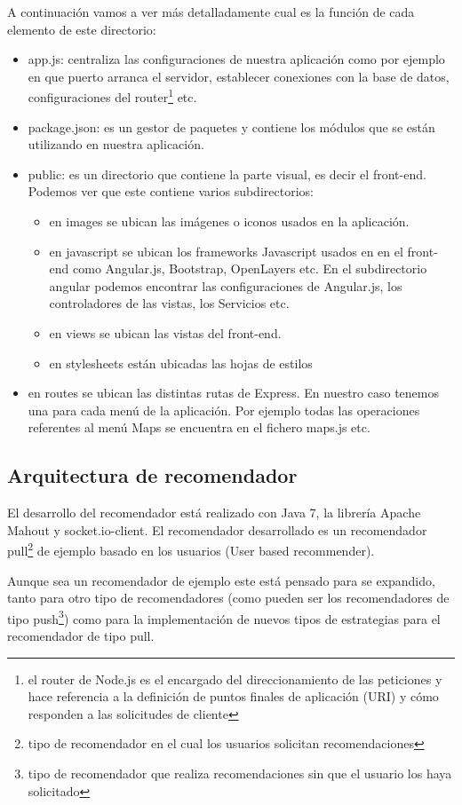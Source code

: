 A continuación vamos a ver más detalladamente cual es la función de cada elemento de este directorio:
\begin{itemize}
	\item app.js: centraliza las configuraciones de nuestra aplicación como por ejemplo en que puerto arranca el servidor, establecer conexiones con la base de datos, configuraciones del router\footnote{el router de Node.js es el encargado del direccionamiento de las peticiones y hace referencia a la definición de puntos finales de aplicación (URI) y cómo responden a las solicitudes de cliente} etc.
	\item package.json: es un gestor de paquetes y contiene los módulos que se están utilizando en nuestra aplicación.
	\item public: es un directorio que contiene la parte visual, es decir el front-end. Podemos ver que este contiene varios subdirectorios:
	\begin{itemize}
	\item en images se ubican las imágenes o iconos usados en la aplicación.
	\item en javascript se ubican los frameworks Javascript usados en en el front-end como Angular.js, Bootstrap, OpenLayers etc. En el subdirectorio angular podemos encontrar las configuraciones de Angular.js, los controladores de las vistas, los Servicios etc.
	\item en views se ubican las vistas del front-end.
	\item en stylesheets están ubicadas las hojas de estilos
	\end{itemize}
	\item en routes se ubican las distintas rutas de Express. En nuestro caso tenemos una para cada menú de la aplicación. Por ejemplo todas las operaciones referentes al menú Maps se encuentra en el fichero maps.js etc.
\end{itemize}

\subsection{Arquitectura de recomendador}


El desarrollo del recomendador está realizado con Java 7, la librería Apache Mahout y socket.io-client. El recomendador desarrollado es un recomendador pull\footnote{tipo de recomendador en el cual los usuarios solicitan recomendaciones} de ejemplo basado en los usuarios (User based recommender). 

Aunque sea un recomendador de ejemplo este está pensado para se expandido, tanto para otro tipo de recomendadores (como pueden ser los recomendadores de tipo push\footnote{tipo de recomendador que realiza recomendaciones sin que el usuario los haya solicitado}) como para la implementación de nuevos tipos de estrategias para el recomendador de tipo pull.

